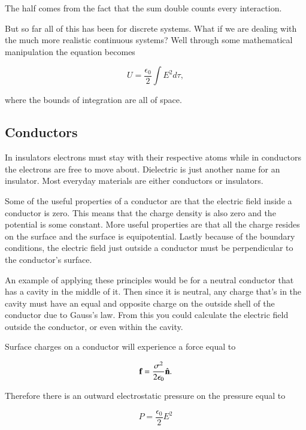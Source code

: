 \documentclass[preprint, review,12pt]{elsarticle}
\def\b{\textbf}
\newcommand{\hb}[1]{\hat{\b #1}}
\begin{document}
The half comes from the fact that the sum double counts every interaction.

But so far all of this has been for discrete systems. What if we are dealing with the much more realistic continuous systems? Well through some mathematical manipulation the equation becomes 

\begin{equation}
    U = \frac{\epsilon_0}{2}\int E^2 d\tau, 
\end{equation}

where the bounds of integration are all of space.

\subsection{Conductors}

In insulators electrons must stay with their respective atoms while in conductors the electrons are free to move about. Dielectric is just another name for an insulator. Most everyday materials are either conductors or insulators. 

Some of the useful properties of a conductor are that the electric field inside a conductor is zero. This means that the charge density is also zero and the potential is some constant. More useful properties are that all the charge resides on the surface and the surface is equipotential. Lastly because of the boundary conditions, the electric field just outside a conductor must be perpendicular to the conductor's surface. 

An example of applying these principles would be for a neutral conductor that has a cavity in the middle of it. Then since it is neutral, any charge that's in the cavity must have an equal and opposite charge on the outside shell of the conductor due to Gauss's law. From this you could calculate the electric field outside the conductor, or even within the cavity.

Surface charges on a conductor will experience a force equal to 

\begin{equation}
    \b{f} = \frac{\sigma^2}{2 \epsilon_0} \hb{n}.
\end{equation}

Therefore there is an outward electrostatic pressure on the pressure equal to

\begin{equation}
    P = \frac{\epsilon_0}{2}E^2
\end{equation}
\end{document}
